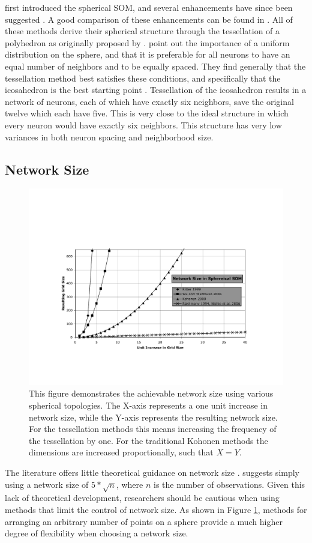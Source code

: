 \documentclass[10pt,titlepage]{article}
\begin{document}
\cite{ritter99} first introduced the spherical SOM, and several enhancements have
since been suggested \citep{boudjemai2003,sangole03,Nishio:2006fk,wu2006}.  A
good comparison of these enhancements can be found in \cite{wu2006}.  All of
these methods derive their spherical structure through the tessellation of a
polyhedron as originally proposed by \cite{ritter99}.  \cite{wu2006} point
out the importance of a uniform distribution on the sphere, and that it is
preferable for all neurons to have an equal number of neighbors and to be
equally spaced.  They find generally that the tessellation method best satisfies
these conditions, and specifically that the icosahedron is the best starting
point \citep{wu2005}. Tessellation of the icosahedron results in a network of
neurons, each of which have exactly six neighbors, save the original twelve
which each have five.  This is very close to the ideal structure in which every
neuron would have exactly six neighbors.  This structure has very low variances
in both neuron spacing and neighborhood size.

\subsection{Network Size}
\begin{figure}
\centering
\includegraphics[width=\linewidth]{networkSize.pdf}
\caption{This figure demonstrates the achievable network size using various
spherical topologies. The X-axis represents a one unit increase in network
size, while the Y-axis represents the resulting network size.  For the
tessellation methods this means increasing the frequency of the tessellation
by one.  For the traditional Kohonen methods the dimensions are increased
proportionally, such that $X=Y$.}
\label{fig:nSize}
\end{figure}
The literature offers little theoretical guidance on network size
\citep{cho1996}.  \cite{toolbox} suggests simply using a network size of
\(5*\sqrt {n}\), where \(n\) is the number of observations. Given this lack of
theoretical development, researchers should be cautious when using methods that
limit the control of network size.  As shown in Figure \ref{fig:nSize},
methods for arranging an arbitrary number of points on a sphere provide a much
higher degree of flexibility when choosing a network size.
\end{document}
